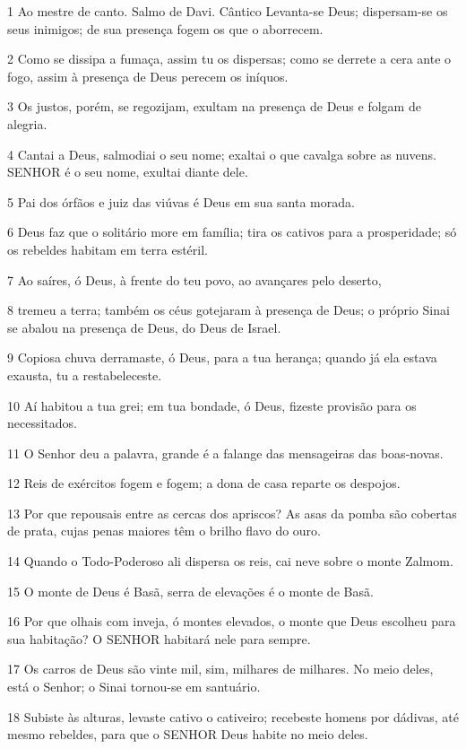\par 1 Ao mestre de canto. Salmo de Davi. Cântico Levanta-se Deus; dispersam-se os seus inimigos; de sua presença fogem os que o aborrecem.
\par 2 Como se dissipa a fumaça, assim tu os dispersas; como se derrete a cera ante o fogo, assim à presença de Deus perecem os iníquos.
\par 3 Os justos, porém, se regozijam, exultam na presença de Deus e folgam de alegria.
\par 4 Cantai a Deus, salmodiai o seu nome; exaltai o que cavalga sobre as nuvens. SENHOR é o seu nome, exultai diante dele.
\par 5 Pai dos órfãos e juiz das viúvas é Deus em sua santa morada.
\par 6 Deus faz que o solitário more em família; tira os cativos para a prosperidade; só os rebeldes habitam em terra estéril.
\par 7 Ao saíres, ó Deus, à frente do teu povo, ao avançares pelo deserto,
\par 8 tremeu a terra; também os céus gotejaram à presença de Deus; o próprio Sinai se abalou na presença de Deus, do Deus de Israel.
\par 9 Copiosa chuva derramaste, ó Deus, para a tua herança; quando já ela estava exausta, tu a restabeleceste.
\par 10 Aí habitou a tua grei; em tua bondade, ó Deus, fizeste provisão para os necessitados.
\par 11 O Senhor deu a palavra, grande é a falange das mensageiras das boas-novas.
\par 12 Reis de exércitos fogem e fogem; a dona de casa reparte os despojos.
\par 13 Por que repousais entre as cercas dos apriscos? As asas da pomba são cobertas de prata, cujas penas maiores têm o brilho flavo do ouro.
\par 14 Quando o Todo-Poderoso ali dispersa os reis, cai neve sobre o monte Zalmom.
\par 15 O monte de Deus é Basã, serra de elevações é o monte de Basã.
\par 16 Por que olhais com inveja, ó montes elevados, o monte que Deus escolheu para sua habitação? O SENHOR habitará nele para sempre.
\par 17 Os carros de Deus são vinte mil, sim, milhares de milhares. No meio deles, está o Senhor; o Sinai tornou-se em santuário.
\par 18 Subiste às alturas, levaste cativo o cativeiro; recebeste homens por dádivas, até mesmo rebeldes, para que o SENHOR Deus habite no meio deles.
